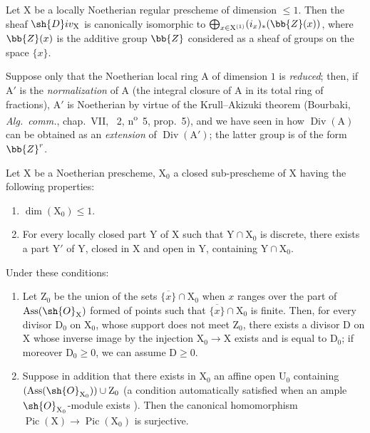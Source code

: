 \begin{proposition}[21.9.9]
\label{IV.21.9.9}
Let $\mathrm{X}$ be a locally Noetherian regular prescheme of dimension $\leq 1$.
Then the sheaf $\sh{D}iv_\mathrm{X}$ is canonically isomorphic to $\bigoplus_{x\in\mathrm{X}^{(1)}}(i_x)_*(\bb{Z}(x))$, where $\bb{Z}(x)$ is the additive group $\bb{Z}$ considered as a sheaf of groups on the space $\{x\}$.
\end{proposition}

\begin{env}[21.9.10]
\label{IV.21.9.10}
Suppose only that the Noetherian local ring $\mathrm{A}$ of dimension $1$ is \emph{reduced};
then, if $\mathrm{A}'$ is the \emph{normalization} of $\mathrm{A}$ (the integral closure of $\mathrm{A}$ in its total ring of fractions), $\mathrm{A}'$ is Noetherian by virtue of the Krull--Akizuki theorem (Bourbaki, \emph{Alg.\ comm.}, chap.~VII, \textsection~2, n\textsuperscript{o}~5, prop.~5), and we have seen in  how
$\operatorname{Div}(\mathrm{A})$ can be obtained as an \emph{extension} of $\operatorname{Div}(\mathrm{A}')$; the latter group is of the form $\bb{Z}^r$.
\end{env}

\begin{proposition}[21.9.11]
\label{IV.21.9.11}
Let $\mathrm{X}$ be a Noetherian prescheme, $\mathrm{X}_0$ a closed sub-prescheme of $\mathrm{X}$ having the following properties:
\begin{enumerate}
  \item[\rm 1\textsuperscript{o}] $\dim(\mathrm{X}_0)\leq 1$.
  \item[\rm 2\textsuperscript{o}] For every locally closed part $\mathrm{Y}$ of $\mathrm{X}$ such that $\mathrm{Y}\cap\mathrm{X}_0$ is discrete, there exists a part $\mathrm{Y}'$ of $\mathrm{Y}$, closed in $\mathrm{X}$ and open in $\mathrm{Y}$, containing $\mathrm{Y}\cap\mathrm{X}_0$.
\end{enumerate}
Under these conditions:
\begin{enumerate}[label=(\roman*)]
  \item Let $\mathrm{Z}_0$ be the union of the sets $\overline{\{x\}}\cap\mathrm{X}_0$ when $x$ ranges over the part of $\operatorname{Ass}(\sh{O}_\mathrm{X})$ formed of points such that $\overline{\{x\}}\cap\mathrm{X}_0$ is finite.
Then, for every divisor $\mathrm{D}_0$ on $\mathrm{X}_0$, whose support does not meet $\mathrm{Z}_0$, there exists a divisor $\mathrm{D}$ on $\mathrm{X}$ whose inverse image by the injection $\mathrm{X}_0\to\mathrm{X}$ exists  and is equal to $\mathrm{D}_0$;
if moreover $\mathrm{D}_0\geq 0$, we can assume $\mathrm{D}\geq 0$.

  \item Suppose in addition that there exists in $\mathrm{X}_0$ an affine open $\mathrm{U}_0$ containing $(\operatorname{Ass}(\sh{O}_{\mathrm{X}_0}))\cup\mathrm{Z}_0$ (a condition automatically satisfied when an ample $\sh{O}_{\mathrm{X}_0}$-module exists ).
Then the canonical homomorphism  $\operatorname{Pic}(\mathrm{X})\to\operatorname{Pic}(\mathrm{X}_0)$ is surjective.
\end{enumerate}
\end{proposition}

